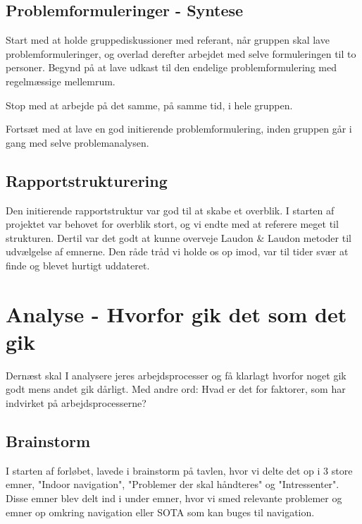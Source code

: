 \documentclass[a4paper,12pt,oneside,article]{memoir}
\begin{document}
        \subsection{Problemformuleringer - Syntese}

        Start med at holde gruppediskussioner med referant, når gruppen skal lave problemformuleringer, og overlad derefter arbejdet med selve formuleringen til to personer.
        Begynd på at lave udkast til den endelige problemformulering med regelmæssige mellemrum.

        Stop med at arbejde på det samme, på samme tid, i hele gruppen.

        Fortsæt med at lave en god initierende problemformulering, inden gruppen går i gang med selve problemanalysen.

\subsection{Rapportstrukturering}

Den initierende rapportstruktur var god til at skabe et overblik. I starten af projektet var behovet for overblik stort, og vi endte med at referere meget til strukturen. Dertil var det godt at kunne overveje Laudon \& Laudon metoder til udvælgelse af emnerne. Den råde tråd vi holde os op imod, var til tider svær at finde og blevet hurtigt uddateret.



    

    \section{Analyse - Hvorfor gik det som det gik}
    Dernæst skal I analysere jeres arbejdsprocesser og få klarlagt hvorfor noget gik godt mens andet gik dårligt. Med andre ord: Hvad er det for faktorer, som har indvirket på arbejdsprocesserne? 

    

        \subsection{Brainstorm}
        I starten af forløbet, lavede i brainstorm på tavlen, hvor vi delte det op i 3 store  emner, "Indoor navigation", "Problemer der skal håndteres" og "Intressenter". Disse emner blev delt ind i under emner, hvor vi smed relevante problemer og emner op omkring navigation eller SOTA som kan buges til navigation. 
\end{document}
